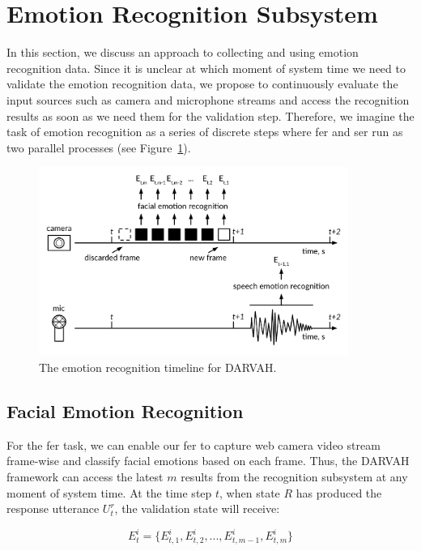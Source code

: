 \section{Emotion Recognition Subsystem}\label{section:ers}

In this section, we discuss an approach to collecting and using emotion recognition data. Since it is unclear at which moment of system time we need to validate the emotion recognition data, we propose to continuously evaluate the input sources such as camera and microphone streams and access the recognition results as soon as we need them for the validation step. Therefore, we imagine the task of emotion recognition as a series of discrete steps where \acrshort{fer} and \acrshort{ser} run as two parallel processes (see Figure~\ref{fig:aer}).

\begin{figure}[htpb]
  \centering
  \includegraphics[width=0.9\textwidth]{figures/aer.png}
  \caption{The emotion recognition timeline for DARVAH.} \label{fig:aer}
\end{figure}

\subsection{Facial Emotion Recognition}

For the \acrshort{fer} task, we can enable our \acrlong{fer} to capture web camera video stream frame-wise and classify facial emotions based on each frame. Thus, the DARVAH framework can access the latest \( m\) results from the recognition subsystem at any moment of system time. At the time step \( t\), when state \(R\) has produced the response utterance \( U_t^r\), the validation state will receive:

\[ E_t^i = \{E_{t,1}^i, E_{t,2}^i,..., E_{t,m-1}^i, E_{t,m}^i\}\]

